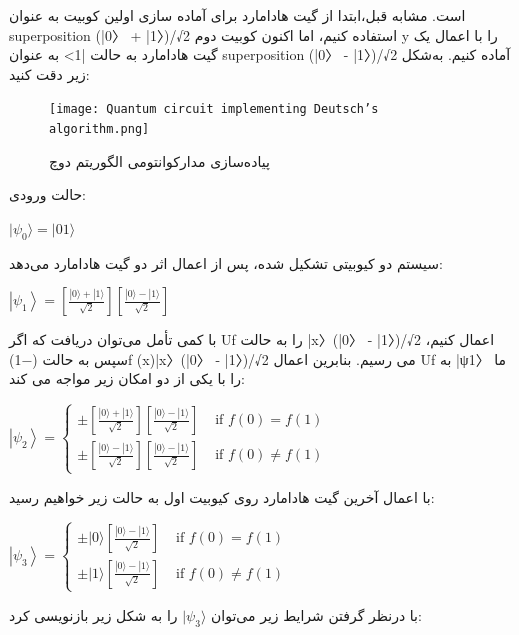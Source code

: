 \documentclass{book}
\begin{document}
است.
مشابه قبل،‌ابتدا از گیت هادامارد برای آماده سازی اولین کوبیت به عنوان superposition (|0〉 + |1〉)/√2 استفاده کنیم، اما اکنون کوبیت دوم y را با اعمال یک گیت هادامارد به حالت |1> به عنوان superposition (|0〉 - |1〉)/√2 آماده کنیم. به‌شکل زیر دقت کنید:



\begin{figure}[ht]
	\centering
	\texttt{[image: Quantum circuit implementing Deutsch’s algorithm.png]}
	\caption{پیاده‌سازی مدارکوانتومی‌ الگوریتم دوچ}
\end{figure}

\newpage

حالت ورودی:\\
\begin{center}
	$\vert\psi_{0}\rangle = \vert01\rangle$
\end{center}

سیستم دو کیوبیتی تشکیل شده،‌ پس از اعمال اثر دو گیت هادامارد می‌دهد:\\

\begin{center}
$\left|\psi_1\right\rangle=\left[\frac{|0\rangle+|1\rangle}{\sqrt{2}}\right]\left[\frac{|0\rangle-|1\rangle}{\sqrt{2}}\right]$
\end{center}
با کمی تأمل می‌توان دریافت که اگر Uf را به حالت |x〉(|0〉 - |1〉)/√2 اعمال کنیم، سپس به حالت (−1)f (x)|x〉(|0〉 - |1〉)/√2 می رسیم. بنابرین اعمال Uf به |ψ1〉 ما را با یکی از دو امکان زیر مواجه می کند:
\begin{center}
	$\left|\psi_2\right\rangle= \begin{cases} \pm\left[\frac{|0\rangle+|1\rangle}{\sqrt{2}}\right]\left[\frac{|0\rangle-|1\rangle}{\sqrt{2}}\right] & \text { if } f(0)=f(1) \\ \pm\left[\frac{|0\rangle-|1\rangle}{\sqrt{2}}\right]\left[\frac{|0\rangle-|1\rangle}{\sqrt{2}}\right] & \text { if } f(0) \neq f(1) \end{cases}$
\end{center}
با اعمال آخرین گیت هادامارد روی کیوبیت اول به حالت زیر خواهیم رسید:
\begin{center}
	$\left|\psi_3\right\rangle= \begin{cases} \pm|0\rangle\left[\frac{|0\rangle-|1\rangle}{\sqrt{2}}\right] & \text { if } f(0)=f(1) \\ \pm|1\rangle\left[\frac{|0\rangle-|1\rangle}{\sqrt{2}}\right] & \text { if } f(0) \neq f(1) \end{cases}$
\end{center}
با درنظر گرفتن شرایط زیر می‌توان $\vert\psi_{3}\rangle$ را به شکل زیر بازنویسی کرد:
\end{document}
